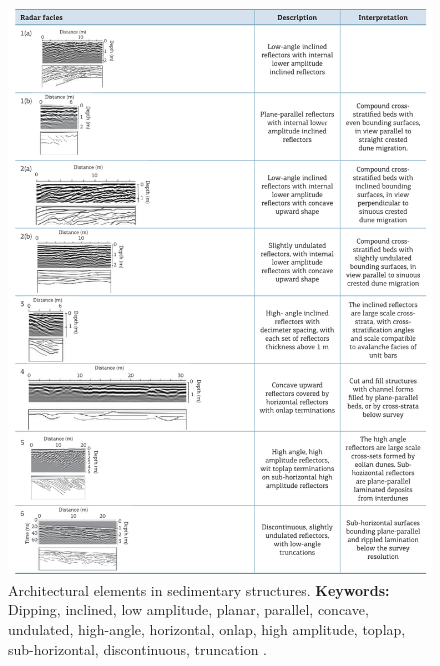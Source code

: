 \begin{figure}[h!]
    \centering
    \includegraphics[width=0.9\linewidth]{Figures/0.2GPR/Tamura2016_Fluvial.png}
    \caption[Architectural elements in sedimentary structures.]{Architectural elements in sedimentary structures. \textbf{Keywords: } Dipping, inclined, low amplitude, planar, parallel, concave, undulated, high-angle, horizontal, onlap, high amplitude, toplap, sub-horizontal, discontinuous, truncation \citep{Tamura2016}.}
    \label{fig:Tamura2016-1}
\end{figure}

